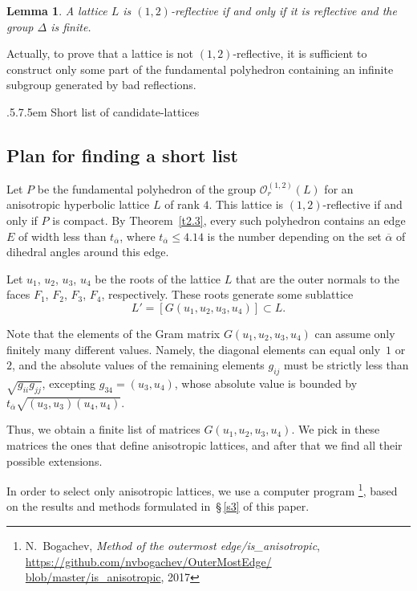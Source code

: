 \documentclass[reqno,12pt]{amsart}
\makeatletter
\def\section{\@startsection{section}{2}%
    {\z@}{.5\linespacing\@plus.7\linespacing}{.5em}%
    {\normalfont\bfseries\centering}}
\newcounter{z}
\newtheorem{lemma}{\indent Lemma}%
\makeatother
\begin{document}
\begin{lemma}
\label{l4.1}
A lattice $L$ is $(1{,}2)$-reflective if and only if it is reflective and the group
$\Delta$ is finite.
\end{lemma}

Actually, to prove that a lattice is not $(1{,}2)$-reflective,
it is sufficient to construct only some part of the fundamental polyhedron containing 
an infinite subgroup generated by bad reflections.

\section{Short list of candidate-lattices}
\label{s5}

\subsection{Plan for finding a short list}
\label{ss5.1}
Let $P$ be the fundamental polyhedron of the group $\mathcal{O}^{(1{,}2)}_r (L)$
for an anisotropic hyperbolic lattice $L$ of rank $4$.
This lattice is $(1{,}2)$-reflective if and only if $P$ is compact.
By Theorem~\ref{t2.3},
every such polyhedron contains an edge $E$ of width less than
 $t_{\overline \alpha}$, where $t_{\overline \alpha} \leq 4.14$ is the number
 depending on the set $\overline \alpha$ of dihedral angles around this edge.

Let $u_1$, $u_2$, $u_3$, $u_4$ be the roots of the lattice $L$ that are the outer
normals to the faces $F_1$, $F_2$, $F_3$, $F_4$, respectively. These roots generate
some sublattice
$$
L'=[G(u_1, u_2, u_3, u_4)] \subset L.
$$

Note that the elements of the Gram matrix $G(u_1, u_2, u_3, u_4)$
can assume only finitely many different values.
Namely, the diagonal elements can equal only~$1$ or $2$,
and the absolute values of the remaining elements $g_{ij}$ must be
strictly less than $\sqrt{g_{ii} g_{jj}}$, excepting $g_{34}=(u_3,
u_4)$, whose absolute value is bounded by $t_{\overline \alpha} \sqrt{(u_3,u_3) (u_4,
u_4)}$.

Thus, we obtain a finite list of matrices $G(u_1, u_2, u_3, u_4)$.
We pick in these matrices the ones that define anisotropic lattices, and
after that we find all their possible extensions.

In order to select only anisotropic lattices, we use a computer program%
\footnote{N.~Bogachev, \textit{Method of the outermost edge/is\_anisotropic},
\href{https://github.com/nvbogachev/OuterMostEdge/blob/master/is\_anisotropic}
{https:/\!/github.com/\allowbreak nvbogachev/\allowbreak OuterMostEdge/\allowbreak
blob/\allowbreak master/is\_anisotropic}, 2017},
based on the results and methods formulated in~\S\,\ref{s3} of this paper.
\end{document}
